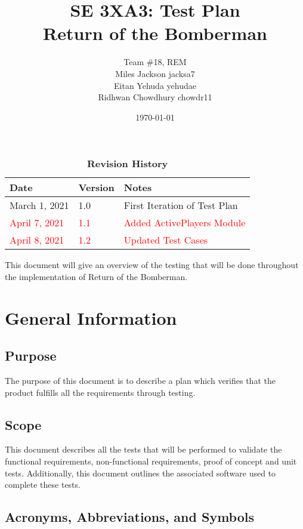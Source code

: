 \documentclass[12pt, titlepage]{article}
\title{SE 3XA3: Test Plan\\Return of the Bomberman}
\author{Team \#18, REM
		\\ Miles Jackson  jacksa7
		\\ Eitan Yehuda  yehudae
		\\ Ridhwan Chowdhury chowdr11
}
\date{\today}
\begin{document}
\maketitle

\tableofcontents
\listoftables
\listoffigures

\begin{table}[bp]
\caption{\bf Revision History}
\begin{tabularx}{\textwidth}{p{3cm}p{2cm}X}
\toprule {\bf Date} & {\bf Version} & {\bf Notes}\\
\midrule
March 1, 2021 & 1.0 & First Iteration of Test Plan\\
\textcolor{red}{April 7, 2021} & \textcolor{red}{1.1} & \textcolor{red}{Added ActivePlayers Module}\\
\textcolor{red}{April 8, 2021} & \textcolor{red}{1.2} & \textcolor{red}{Updated Test Cases}\\
\bottomrule
\end{tabularx}
\end{table}

\newpage


\parindent

This document will give an overview of the testing that will be done throughout the implementation of Return of the Bomberman.

\section{General Information}

\subsection{Purpose}
The purpose of this document is to describe a plan which verifies that the product fulfills all the requirements through testing.

\subsection{Scope}
This document describes all the tests that will be performed to validate the functional requirements, non-functional requirements, proof of concept and unit tests. Additionally, this document outlines the associated software used to complete these tests.

\subsection{Acronyms, Abbreviations, and Symbols}
	
\end{document}
